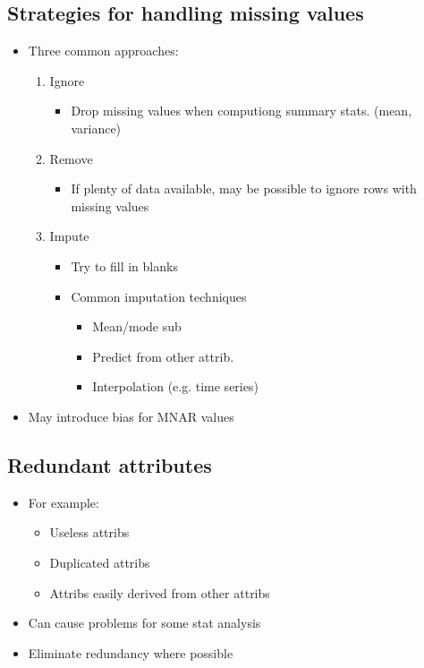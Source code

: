\documentclass[a4paper]{article}
\begin{document}
\subsection{Strategies for handling missing values}
\begin{itemize}
	\item Three common approaches:
	\begin{enumerate}
		\item Ignore
		\begin{itemize}
			\item Drop missing values when computiong summary stats.
				(mean, variance)
		\end{itemize}
		\item Remove
		\begin{itemize}
			\item If plenty of data available, may be possible to
				ignore rows with missing values
		\end{itemize}
		\item Impute
		\begin{itemize}
			\item Try to fill in blanks
			\item Common imputation techniques
			\begin{itemize}
				\item Mean/mode sub
				\item Predict from other attrib.
				\item Interpolation (e.g. time series)
			\end{itemize}
		\end{itemize}
	\end{enumerate}
	\item May introduce bias for MNAR values
\end{itemize}
\subsection{Redundant attributes}
\begin{itemize}
	\item For example:
	\begin{itemize}
		\item Useless attribs
		\item Duplicated attribs
		\item Attribs easily derived from other attribs
	\end{itemize}
	\item Can cause problems for some stat analysis
	\item Eliminate redundancy where possible
\end{itemize}
\end{document}
